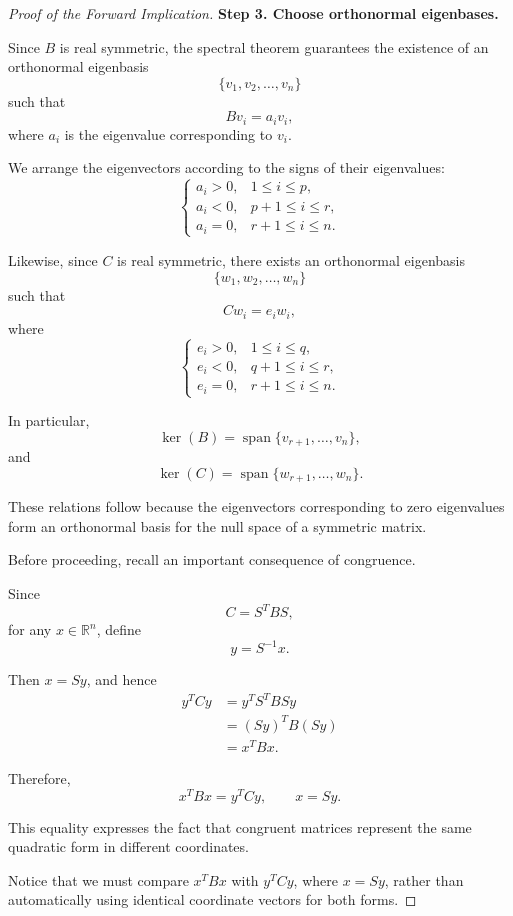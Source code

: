 \documentclass[11pt]{article}
\theoremstyle{definition}
\theoremstyle{remark}
\begin{document}
\begin{proof}[Proof of the Forward Implication]
\medskip

\textbf{Step 3. Choose orthonormal eigenbases.}

Since $B$ is real symmetric, the spectral
theorem guarantees the existence of an
orthonormal eigenbasis
\[
    \{v_1,v_2,\ldots,v_n\}
\]
such that
\[
    Bv_i=a_iv_i,
\]
where $a_i$ is the eigenvalue corresponding
to $v_i$.

We arrange the eigenvectors according to
the signs of their eigenvalues:
\[
\begin{cases}
    a_i>0, &1\leq i\leq p,\\
    a_i<0, &p+1\leq i\leq r,\\
    a_i=0, &r+1\leq i\leq n.
\end{cases}
\]

Likewise, since $C$ is real symmetric,
there exists an orthonormal eigenbasis
\[
    \{w_1,w_2,\ldots,w_n\}
\]
such that
\[
    Cw_i=e_iw_i,
\]
where
\[
\begin{cases}
    e_i>0, &1\leq i\leq q,\\
    e_i<0, &q+1\leq i\leq r,\\
    e_i=0, &r+1\leq i\leq n.
\end{cases}
\]

In particular,
\[
    \ker(B)
    =\operatorname{span}
    \{v_{r+1},\ldots,v_n\},
\]
and
\[
    \ker(C)
    =\operatorname{span}
    \{w_{r+1},\ldots,w_n\}.
\]

These relations follow because the
eigenvectors corresponding to zero
eigenvalues form an orthonormal basis
for the null space of a symmetric matrix.

Before proceeding, recall an important
consequence of congruence.

Since
\[
    C=S^TBS,
\]
for any $x\in\mathbb{R}^n$, define
\[
    y=S^{-1}x.
\]

Then $x=Sy$, and hence
\[
\begin{aligned}
    y^TCy
    &=y^TS^TBSy\\
    &=(Sy)^TB(Sy)\\
    &=x^TBx.
\end{aligned}
\]

Therefore,
\[
    \boxed{x^TBx=y^TCy,\qquad x=Sy.}
\]

This equality expresses the fact that
congruent matrices represent the same
quadratic form in different coordinates.

Notice that we must compare $x^TBx$
with $y^TCy$, where $x=Sy$, rather
than automatically using identical
coordinate vectors for both forms.


\end{proof}
\end{document}
